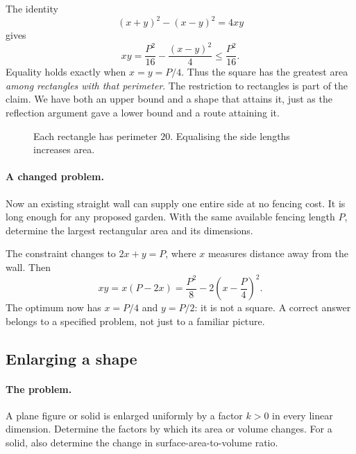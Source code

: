 The identity
\[
(x+y)^2-(x-y)^2=4xy
\]
gives
\[
xy=\frac{P^2}{16}-\frac{(x-y)^2}{4}\leq\frac{P^2}{16}.
\]
Equality holds exactly when $x=y=P/4$. Thus the square has the greatest
area \emph{among rectangles with that perimeter}. The restriction to
rectangles is part of the claim. We have both an upper bound and a shape
that attains it, just as the reflection argument gave a lower bound and
a route attaining it.

\begin{figure}[htbp]\centering
{}
\caption{Each rectangle has perimeter $20$. Equalising the side lengths increases area.}
\end{figure}

\paragraph{A changed problem.}
Now an existing straight wall can supply one entire side at no fencing
cost. It is long enough for any proposed garden. With the same available
fencing length $P$, determine the largest rectangular area and its dimensions.

The constraint changes to $2x+y=P$, where
$x$ measures distance away from the wall. Then
\[
xy=x(P-2x)=\frac{P^2}{8}-2\left(x-\frac P4\right)^2.
\]
The optimum now has $x=P/4$ and $y=P/2$: it is not a square.
A correct answer belongs to a specified problem, not just to a familiar picture.

\subsection{Enlarging a shape}
\paragraph{The problem.}
A plane figure or solid is enlarged uniformly by a factor $k>0$ in every
linear dimension. Determine the factors by which its area or volume
changes. For a solid, also determine the change in surface-area-to-volume ratio.

